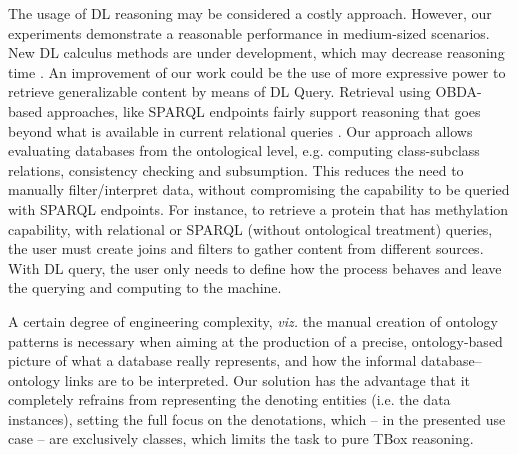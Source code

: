 The usage of DL reasoning may be considered a costly approach. However, our experiments demonstrate a reasonable performance in medium-sized scenarios. New DL calculus methods are under development, which may decrease reasoning time \citep{Freitas2011}.
An improvement of our work could be the use of more expressive power to retrieve generalizable content by means of DL Query. Retrieval using OBDA-based approaches, like SPARQL endpoints fairly support reasoning that goes beyond what is available in current relational queries \citep{Angles2008a}. Our approach allows evaluating databases from the ontological level, e.g. computing class-subclass relations, consistency checking and subsumption. This reduces the need to manually filter/interpret data, without compromising the capability to be queried with SPARQL endpoints.
For instance, to retrieve a protein that has methylation capability, with relational or SPARQL (without ontological treatment) queries, the user must create joins and filters to gather content from different sources. With DL query, the user only needs to define how the process behaves and leave the querying and computing to the machine. 



A certain degree of engineering complexity, \emph{viz.} the manual creation of ontology patterns is necessary when aiming at the production of a precise, ontology-based picture of what a database really represents, and how the informal database--ontology links are to be interpreted. Our solution has the advantage that it completely refrains from representing the denoting entities (i.e. the data instances), setting the full focus on the denotations, which -- in the presented use case -- are exclusively classes, which limits the task to pure TBox reasoning.

